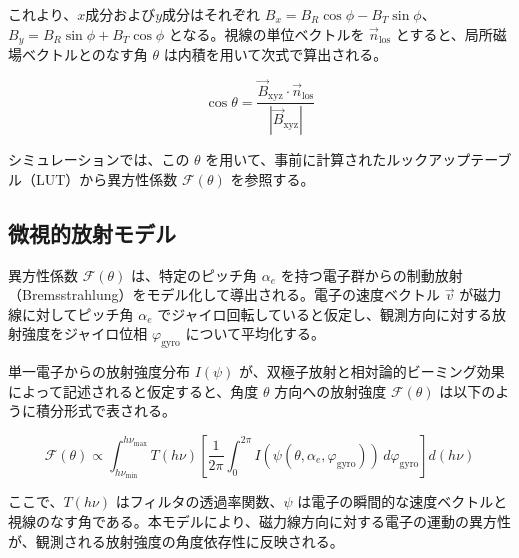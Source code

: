\documentclass[a4paper,11pt]{jsarticle}
\begin{document}
これより、$x$成分および$y$成分はそれぞれ $B_x = B_R \cos\phi - B_T \sin\phi$、$B_y = B_R \sin\phi + B_T \cos\phi$ となる。視線の単位ベクトルを $\vec{n}_{\mathrm{los}}$ とすると、局所磁場ベクトルとのなす角 $\theta$ は内積を用いて次式で算出される。

\begin{equation}
    \cos\theta = \frac{\vec{B}_{\mathrm{xyz}} \cdot \vec{n}_{\mathrm{los}}}{|\vec{B}_{\mathrm{xyz}}|}
\end{equation}

シミュレーションでは、この $\theta$ を用いて、事前に計算されたルックアップテーブル（LUT）から異方性係数 $\mathcal{F}(\theta)$ を参照する。

\subsection{微視的放射モデル}

異方性係数 $\mathcal{F}(\theta)$ は、特定のピッチ角 $\alpha_e$ を持つ電子群からの制動放射（Bremsstrahlung）をモデル化して導出される。電子の速度ベクトル $\vec{v}$ が磁力線に対してピッチ角 $\alpha_e$ でジャイロ回転していると仮定し、観測方向に対する放射強度をジャイロ位相 $\varphi_{\mathrm{gyro}}$ について平均化する。

単一電子からの放射強度分布 $I(\psi)$ が、双極子放射と相対論的ビーミング効果によって記述されると仮定すると、角度 $\theta$ 方向への放射強度 $\mathcal{F}(\theta)$ は以下のように積分形式で表される。

\begin{equation}
    \mathcal{F}(\theta) \propto \int_{h\nu_{\min}}^{h\nu_{\max}} T(h\nu) \left[ \frac{1}{2\pi} \int_{0}^{2\pi} I(\psi(\theta, \alpha_e, \varphi_{\mathrm{gyro}})) \, d\varphi_{\mathrm{gyro}} \right] d(h\nu)
\end{equation}

ここで、$T(h\nu)$ はフィルタの透過率関数、$\psi$ は電子の瞬間的な速度ベクトルと視線のなす角である。本モデルにより、磁力線方向に対する電子の運動の異方性が、観測される放射強度の角度依存性に反映される。
\end{document}

